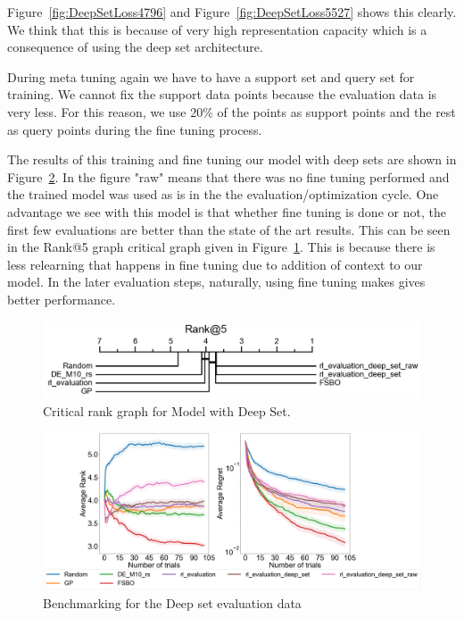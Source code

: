 \documentclass[12pt, twoside, ngerman]{report}
\begin{document}
Figure~\ref{fig:DeepSetLoss4796} and Figure~\ref{fig:DeepSetLoss5527} shows this clearly.
We think that this is because of very high representation capacity which is a consequence of using the deep set architecture.

During meta tuning again we have to have a support set and query set for training.
We cannot fix the support data points because the evaluation data is very less.
For this reason,  we use 20\% of the points as support points and the rest as query points during the fine tuning process.

The results of this training and fine tuning our model with deep sets are shown in Figure~\ref{fig:RLDeepSetevaluation}.
In the figure "raw" means that there was no fine tuning performed and the trained model was used as is in the the evaluation/optimization cycle.
One advantage we see with this model is that whether fine tuning is done or not,  the first few evaluations are better than the state of the art results.
This can be seen in the Rank@5 graph critical graph given in Figure~\ref{fig:DeepSetRank5}.
This is because there is less relearning that happens in fine tuning due to addition of context to our model.
In the later evaluation steps, naturally,  using fine tuning makes gives better performance.

\begin{figure}[h]
  \centering
    \includegraphics[scale=0.35]{images/DeepSetRank5}
    \caption{Critical rank graph for Model with Deep Set.}
    \label{fig:DeepSetRank5}
\end{figure}

\begin{figure}[h]
  \centering
    \includegraphics[scale=0.20]{images/RLDeepSetevaluation}
    \caption{Benchmarking for the Deep set evaluation data}
    \label{fig:RLDeepSetevaluation}
\end{figure}
\end{document}
